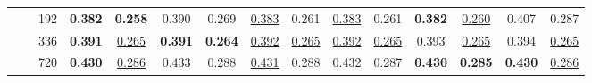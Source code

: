 \begin{table*}[!ht]
{\begin{tabular}{c|c|c|cc|cc|cc|cc|cc|cc}
         & & 192 & \textbf{0.382} & \textbf{0.258} &  0.390 & 0.269 &  \underline{0.383} & 0.261 &  \underline{0.383} & 0.261 &  \textbf{0.382} & \underline{0.260} &  0.407 & 0.287 \\
         & & 336 &  \textbf{0.391} & \underline{0.265} &  \textbf{0.391} & \textbf{0.264} &  \underline{0.392} & \underline{0.265} &  \underline{0.392} & \underline{0.265} &  0.393 & \underline{0.265} &  0.394 & \underline{0.265} \\
         & & 720 &  \textbf{0.430} & \underline{0.286} &  0.433 & 0.288 &  \underline{0.431} & 0.288 &  0.432 & 0.287 &  \textbf{0.430} & \textbf{0.285} &  \textbf{0.430} & \underline{0.286} \\
    \bottomrule
    \end{tabular}}
\end{table*}




